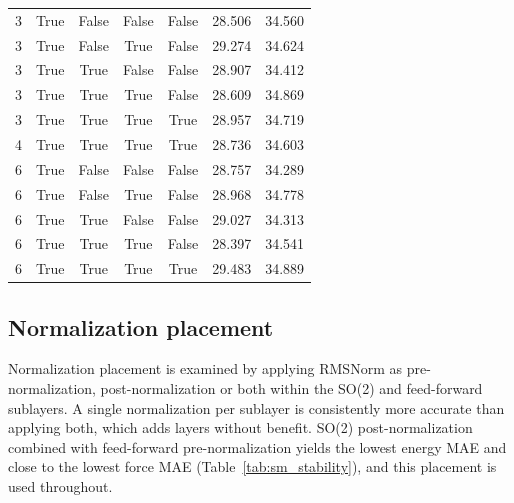 \begin{table}[ht]
\begin{tabular*}{\linewidth}{@{\extracolsep{\fill}}ccccccc@{}}
        3                          & True                       & False                & False & False & 28.506          & 34.560          \\
        3                          & True                       & False                & True  & False & 29.274          & 34.624          \\
        3                          & True                       & True                 & False & False & 28.907          & 34.412          \\
        3                          & True                       & True                 & True  & False & 28.609          & 34.869          \\
        3                          & True                       & True                 & True  & True  & 28.957          & 34.719          \\
        4                          & True                       & True                 & True  & True  & 28.736          & 34.603          \\
        6                          & True                       & False                & False & False & 28.757          & 34.289          \\
        6                          & True                       & False                & True  & False & 28.968          & 34.778          \\
        6                          & True                       & True                 & False & False & 29.027          & 34.313          \\
        6                          & True                       & True                 & True  & False & 28.397          & 34.541          \\
        6                          & True                       & True                 & True  & True  & 29.483          & 34.889          \\
        \bottomrule
    \end{tabular*}
\end{table}

\FloatBarrier
\subsection{Normalization placement}

Normalization placement is examined by applying RMSNorm as pre-normalization,
post-normalization or both within the SO(2) and feed-forward sublayers. A single
normalization per sublayer is consistently more accurate than applying both,
which adds layers without benefit. SO(2) post-normalization combined with
feed-forward pre-normalization yields the lowest energy MAE and close to the
lowest force MAE (Table~\ref{tab:sm_stability}), and this placement is used
throughout.

